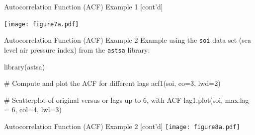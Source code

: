 \documentclass[ignorenonframetext,xcolor=x11names]{beamer}
\begin{document}
\begin{frame}{Autocorrelation Function (ACF) Example 1 \small [cont'd]}
\begin{center}
\texttt{[image: figure7a.pdf]}
\end{center}
\end{frame}

\begin{frame}[fragile]{Autocorrelation Function (ACF) Example 2}
Example using the \texttt{soi} data set (sea level air pressure index) from the \texttt{astsa} library:
\begin{Rcode}
library(astsa)

# Compute and plot the ACF for different lags
acf1(soi, co=3, lwd=2)

# Scatterplot of original versus or lags up to 6, with ACF
lag1.plot(soi, max.lag = 6, col=4, lwl=3)
\end{Rcode}
\end{frame}

\begin{frame}{Autocorrelation Function (ACF) Example 2 \small [cont'd]}
\centering
\texttt{[image: figure8a.pdf]}
\end{frame}


\end{document}
